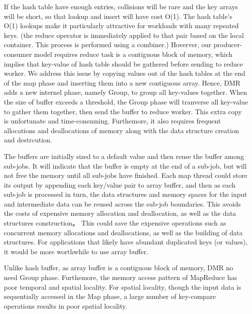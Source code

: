 If the hash table have enough entries, 
collisions will be rare and the key arrays will be short,
so that lookup and insert will have cost O(1).
The hash table's O(1) lookups 
make it particularly attractive for workloads with many repeated keys.
{\color{gray}(the reduce operator is immediately applied
to that pair based on the local container. This process is
performed using a combiner.)}
Hoverver, our producer-consumer model requires
reduce task is a contiguous block of memory, 
which implies that key-value of hash table should be gathered
before sending to reduce worker.
We address this issue by 
copying values out of the hash tables
at the end of the map phase and 
inserting them into a new contiguous array.
Hence, DMR adds a new internel phase, namely Group,
to group all key-values together.
When the size of buffer exceeds a threshold,
the Group phase will tranverse all key-value to gather them together,
then send the buffer to reduce worker.
This extra copy is unfortunate and time-consuming.
Furthemore, 
it also requires frequent allocations and deallocations of memory 
along with the data structure creation and destrcution.


The buffers are initially sized to a default value  and 
then reuse the buffer among sub-jobs.
It will indicate that the buffer is empty at the end of a sub-job, 
but will not free the memory until all sub-jobs have finished.
Each map thread could store its output 
by appending each key/value pair to array buffer, 
and then as each sub-job is processed in turn,
the data structures and memory spaces 
for the input and intermediate data can be reused across the sub-job boundaries. 
This avoids the costs of expensive memory allocation and deallocation, 
as well as the data structures construction。
This could save the expensive operations 
such as
concurrent memory allocations and deallocations,
as well as the building of data structures.
For applications that likely have abundant duplicated keys (or values), 
it would be more worthwhile to use array buffer.


Unlike hash buffer, as array buffer is a contiguous block of memory, 
DMR no need Group phase.
Furthemore, the memory access pattern of MapReduce
has poor temporal and spatial locality.%
For spatial locality, 
though the input data is sequentially accessed in the Map phase,
a large number of key-compare operations results in poor spatial locality. 


